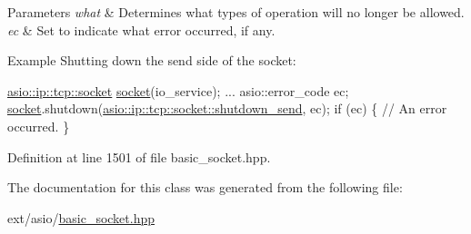 \begin{DoxyParams}{Parameters}
{\em what} & Determines what types of operation will no longer be allowed.\\
\hline
{\em ec} & Set to indicate what error occurred, if any.\\
\hline
\end{DoxyParams}
\begin{DoxyParagraph}{Example}
Shutting down the send side of the socket\+: 
\begin{DoxyCode}
\hyperlink{classasio_1_1basic__stream__socket}{asio::ip::tcp::socket} \hyperlink{namespacewebsocketpp_1_1transport_1_1asio_1_1socket_1_1error_a828ddaa5ed63a761e1b557465a35f05aa0c31b356014843e1d09514e794a539a7}{socket}(io\_service);
...
asio::error\_code ec;
\hyperlink{namespacewebsocketpp_1_1transport_1_1asio_1_1socket_1_1error_a828ddaa5ed63a761e1b557465a35f05aa0c31b356014843e1d09514e794a539a7}{socket}.shutdown(\hyperlink{classasio_1_1socket__base_a915e52ff147efd296350bba81f795c37a042d0121d26acaa45a86e0db3cb8aa62}{asio::ip::tcp::socket::shutdown\_send}, ec);
\textcolor{keywordflow}{if} (ec)
\{
  \textcolor{comment}{// An error occurred.}
\}
\end{DoxyCode}
 
\end{DoxyParagraph}


Definition at line 1501 of file basic\+\_\+socket.\+hpp.



The documentation for this class was generated from the following file\+:\begin{DoxyCompactItemize}
\item 
ext/asio/\hyperlink{basic__socket_8hpp}{basic\+\_\+socket.\+hpp}\end{DoxyCompactItemize}
